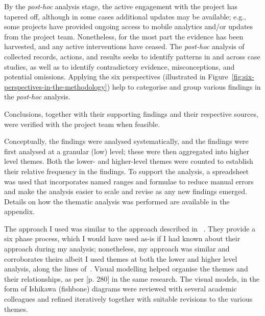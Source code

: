 By the \emph{post-hoc} analysis stage, the active engagement with the project has tapered off, although in some cases additional updates may be available; e.g., some projects have provided ongoing access to mobile analytics and/or updates from the project team. Nonetheless, for the most part the evidence has been harvested, and any active interventions have ceased. The  \emph{post-hoc} analysis of collected records, actions, and results seeks to identify patterns in and across case studies, as well as to identify contradictory evidence,  misconceptions, and potential omissions.  Applying the six perspectives (illustrated in Figure~\ref{fig:six-perspectives-in-the-methodology}) help to categorise and group various findings in the \emph{post-hoc} analysis. 

Conclusions, together with their supporting findings and their respective sources, were verified with the project team when feasible. 

Conceptually, the findings were analysed systematically, and the findings were first analysed at a granular (low) level; these were then aggregated into higher level themes. Both the lower- and higher-level themes were counted to establish their relative frequency in the findings. 
To support the analysis, a spreadsheet was used that incorporates named ranges and formulae to reduce manual errors and make the analysis easier to scale and revise as any new findings emerged. Details on how the thematic analysis was performed are available in the \href{appendix-thematic-analysis}{} appendix.

The approach I used was similar to the approach described in ~. They provide a six phase process, which I would have used as-is if I had known about their approach during my analysis; nonetheless, my approach was similar and corroborates theirs albeit I used themes at both the lower and higher level analysis, along the lines of~. Visual modelling helped organise the themes and their relationships, as per [p. 280] in the same research. The visual models, in the form of Ishikawa (fishbone) diagrams were reviewed with several academic colleagues and refined iteratively together with suitable revisions to the various themes.

